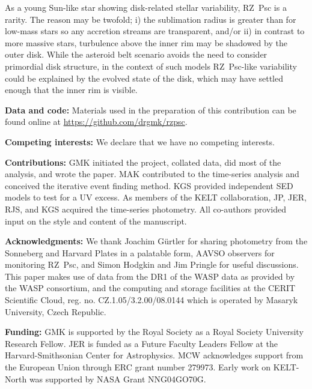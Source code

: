\documentclass[]{rsos}
\begin{document}
As a young Sun-like star showing disk-related stellar variability, RZ~Psc is a
rarity. The reason may be twofold; i) the sublimation radius is greater than for low-mass
stars so any accretion streams are transparent, and/or ii) in contrast to more massive
stars, turbulence above the inner rim may be shadowed by the outer disk. While the
asteroid belt scenario avoids the need to consider primordial disk structure, in the
context of such models RZ~Psc-like variability could be explained by the evolved state of
the disk, which may have settled enough that the inner rim is visible.

\ack{}

\textbf{Data and code:} Materials used in the preparation of this contribution can be
found online at \href{https://github.com/drgmk/rzpsc}{https://github.com/drgmk/rzpsc}.

\textbf{Competing interests:} We declare that we have no competing interests.

\textbf{Contributions:} GMK initiated the project, collated data, did most of the
analysis, and wrote the paper. MAK contributed to the time-series analysis and conceived
the iterative event finding method. KGS provided independent SED models to test for a UV
excess. As members of the KELT collaboration, JP, JER, RJS, and KGS acquired the
time-series photometry. All co-authors provided input on the style and content of the
manuscript.

\textbf{Acknowledgments:} We thank Joachim G\"urtler for sharing photometry from the
Sonneberg and Harvard Plates in a palatable form, AAVSO observers for monitoring RZ~Psc,
and Simon Hodgkin and Jim Pringle for useful discussions. This paper makes use of data
from the DR1 of the WASP data \cite{2010A&A...520L..10B} as provided by the WASP
consortium, and the computing and storage facilities at the CERIT Scientific Cloud,
reg. no. CZ.1.05/3.2.00/08.0144 which is operated by Masaryk University, Czech Republic.

\textbf{Funding:} GMK is supported by the Royal Society as a Royal Society University
Research Fellow. JER is funded as a Future Faculty Leaders Fellow at the
Harvard-Smithsonian Center for Astrophysics. MCW acknowledges support from the European
Union through ERC grant number 279973. Early work on KELT-North was supported by NASA
Grant NNG04GO70G.

 

%
\end{document}
